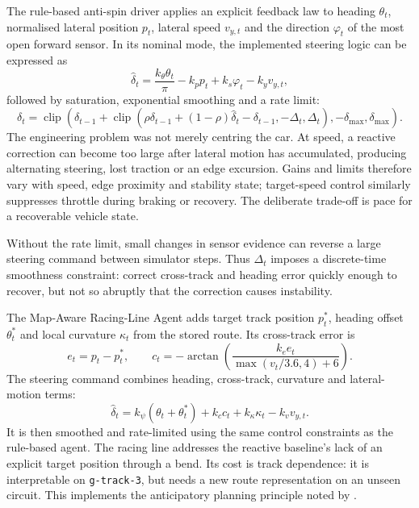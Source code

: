 The rule-based anti-spin driver applies an explicit feedback law to heading $\theta_t$, normalised lateral position $p_t$, lateral speed $v_{y,t}$ and the direction $\varphi_t$ of the most open forward sensor. In its nominal mode, the implemented steering logic can be expressed as
\begin{equation*}
  \hat{\delta}_t = \frac{k_\theta\theta_t}{\pi}
  - k_p p_t + k_s\varphi_t - k_yv_{y,t},
\end{equation*}
followed by saturation, exponential smoothing and a rate limit:
\begin{equation*}
  \delta_t=\operatorname{clip}\!\left(\delta_{t-1}+
  \operatorname{clip}\!\left(\rho\delta_{t-1}+(1-\rho)\hat{\delta}_t-\delta_{t-1},
  -\Delta_t,\Delta_t\right),-\delta_{\max},\delta_{\max}\right).
\end{equation*}
The engineering problem was not merely centring the car. At speed, a reactive correction can become too large after lateral motion has accumulated, producing alternating steering, lost traction or an edge excursion. Gains and limits therefore vary with speed, edge proximity and stability state; target-speed control similarly suppresses throttle during braking or recovery. The deliberate trade-off is pace for a recoverable vehicle state.

Without the rate limit, small changes in sensor evidence can reverse a large steering command between simulator steps. Thus $\Delta_t$ imposes a discrete-time smoothness constraint: correct cross-track and heading error quickly enough to recover, but not so abruptly that the correction causes instability.

The Map-Aware Racing-Line Agent adds target track position $p_t^*$, heading offset $\theta_t^*$ and local curvature $\kappa_t$ from the stored route. Its cross-track error is
\begin{equation*}
  e_t=p_t-p_t^*, \qquad
  c_t=-\arctan\!\left(\frac{k_e e_t}{\max(v_t/3.6,4)+6}\right).
\end{equation*}
The steering command combines heading, cross-track, curvature and lateral-motion terms:
\begin{equation*}
  \hat{\delta}_t=k_\psi(\theta_t+\theta_t^*)+k_cc_t+k_\kappa\kappa_t-k_vv_{y,t}.
\end{equation*}
It is then smoothed and rate-limited using the same control constraints as the rule-based agent. The racing line addresses the reactive baseline's lack of an explicit target position through a bend. Its cost is track dependence: it is interpretable on \texttt{g-track-3}, but needs a new route representation on an unseen circuit. This implements the anticipatory planning principle noted by \textcite{quadflieg2010}.

